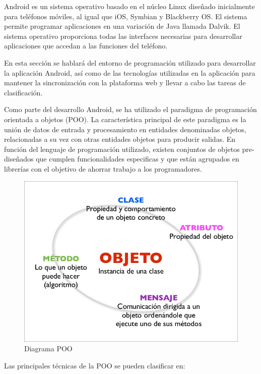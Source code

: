 \documentclass[a4paper,11pt]{book}
\begin{document}
Android es un sistema operativo basado en el núcleo Linux diseñado inicialmente para teléfonos móviles, al igual que iOS, Symbian y Blackberry OS. El sistema permite programar aplicaciones en una variación de Java llamada Dalvik. El sistema operativo proporciona todas las interfaces necesarias para desarrollar aplicaciones que accedan a las funciones del teléfono. 

En esta sección se hablará del entorno de programación utilizado para desarrollar la aplicación Android, así como de las tecnologías utilizadas en la aplicación para mantener la sincronización con la plataforma web y llevar a cabo las tareas de clasificación.

Como parte del desarrollo Android, se ha utilizado el paradigma de programación orientada a objetos (POO)\cite{ood}. La característica principal de este paradigma es la unión de datos de entrada y procesamiento en entidades denominadas objetos,  relacionadas a su vez con otras entidades objetos para producir salidas. En función del lenguaje de programación utilizado, existen conjuntos de objetos pre-diseñados que cumplen funcionalidades especificas y que están agrupados en librerías con el objetivo de ahorrar trabajo a los programadores.


\begin{figure}[H] 
\centering 
\includegraphics[scale=0.35]{imagenes/desarrollo_herramienta/pdo.jpg}
\caption{ Diagrama POO\cite{poo}}
\end{figure}


Las principales técnicas de la POO se pueden clasificar en:
\end{document}
